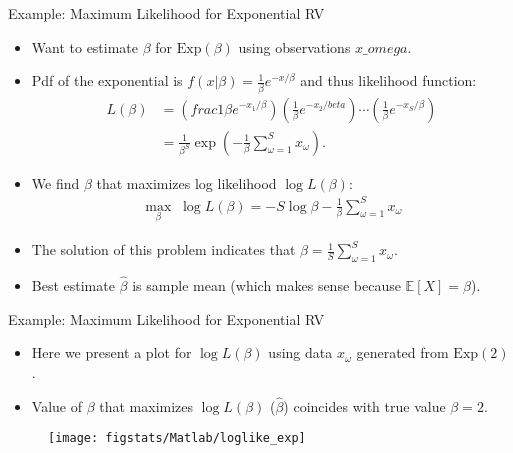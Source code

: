 \documentclass[9pt]{beamer}
\begin{document}
%
\begin{frame}{Example: Maximum Likelihood for Exponential RV}

\begin{itemize}
\item Want to estimate $\beta$ for $\textrm{Exp}(\beta)$ using observations $x\_omega$. 
\item Pdf of the exponential is $f(x|\beta)=\frac{1}{\beta}e^{-x/\beta}$ and thus likelihood function:
\begin{align*}
L(\beta)&=\left(frac{1}{\beta}e^{-x_1/\beta}\right)\left(\frac{1}{\beta}e^{-x_2/beta}\right)\cdots\left(\frac{1}{\beta}e^{-x_S/\beta}\right)\\
&=\frac{1}{\beta^S}\exp \left(-\frac{1}{\beta}\sum_{\omega=1}^Sx_\omega\right).
\end{align*}
\item We find $\beta$ that maximizes log likelihood $\log L(\beta)$:
\begin{align*}
\max_{\beta}\; \log L(\beta)=-S\log \beta -\frac{1}{\beta}\sum_{\omega=1}^Sx_\omega
\end{align*}
\item The solution of this problem indicates that $\hat{\beta}=\frac{1}{S}\sum_{\omega=1}^Sx_\omega$.
\item Best estimate $\hat{\beta}$ is sample mean (which makes sense because $\mathbb{E}[X]=\beta$). 
\end{itemize}


\end{frame}

%
\begin{frame}{Example: Maximum Likelihood for Exponential RV}

\begin{itemize}
\item Here we present a plot for $\log L(\beta)$ using data $x_\omega$ generated from $\textrm{Exp}(2)$. 
\item Value of $\beta$ that maximizes $\log L(\beta)$ ($\hat{\beta}$) coincides with true value $\beta=2$. 
\end{itemize}
\begin{figure}[!htb]
    \centering
	\texttt{[image: figstats/Matlab/loglike\_exp]}
\end{figure}

\end{frame}
\end{document}
